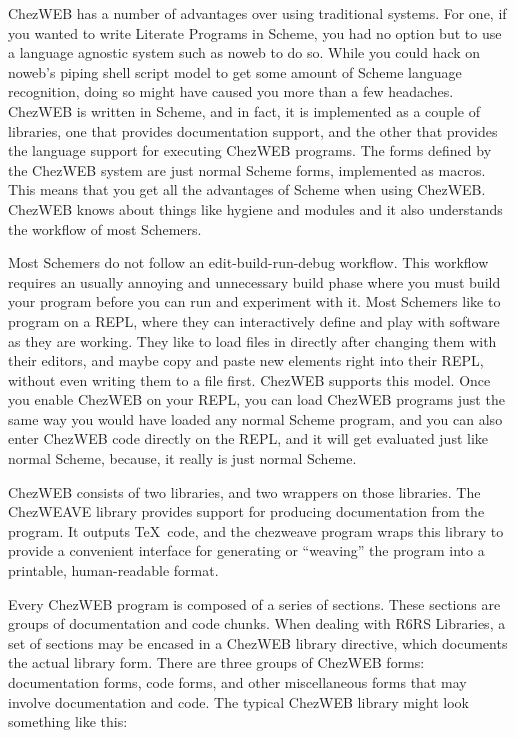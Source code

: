 ChezWEB has a number of advantages over using traditional systems.
For one, if you wanted to write Literate Programs in Scheme, you had
no option but to use a language agnostic system such as noweb to do
so.  While you could hack on noweb's piping shell script model to get
some amount of Scheme language recognition, doing so might have caused
you more than a few headaches.  ChezWEB is written in Scheme, and in
fact, it is implemented as a couple of libraries, one that provides
documentation support, and the other that provides the language
support for executing ChezWEB programs.  The forms defined by the
ChezWEB system are just normal Scheme forms, implemented as macros.
This means that you get all the advantages of Scheme when using
ChezWEB.  ChezWEB knows about things like hygiene and modules and it
also understands the workflow of most Schemers.

Most Schemers do not follow an edit-build-run-debug workflow.  This
workflow requires an usually annoying and unnecessary build phase
where you must build your program before you can run and experiment
with it.  Most Schemers like to program on a REPL, where they can
interactively define and play with software as they are working.  They
like to load files in directly after changing them with their editors,
and maybe copy and paste new elements right into their REPL, without
even writing them to a file first.  ChezWEB supports this model.  Once
you enable ChezWEB on your REPL, you can load ChezWEB programs just
the same way you would have loaded any normal Scheme program, and you
can also enter ChezWEB code directly on the REPL, and it will get
evaluated just like normal Scheme, because, it really is just normal
Scheme.

ChezWEB consists of two libraries, and two wrappers on those
libraries.  The ChezWEAVE library provides support for producing
documentation from the program.  It outputs \TeX\ code, and the
chezweave program wraps this library to provide a convenient interface
for generating or ``weaving'' the program into a printable,
human-readable format.

%
Every ChezWEB program is composed of a series of sections. These sections are groups of documentation and code chunks. When dealing with R6RS Libraries, a set of sections may be encased in a ChezWEB library directive, which documents the actual library form. There are three groups of ChezWEB forms: documentation forms, code forms, and other miscellaneous forms that may involve documentation and code. The typical ChezWEB library might look something like this:

